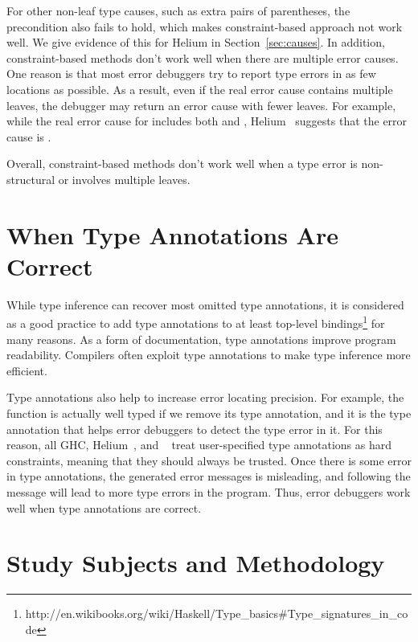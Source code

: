 \documentclass[12pt]{report}	%
\begin{document}
%
For other non-leaf type causes, such as extra pairs
of parentheses, the precondition also fails to hold,
which makes constraint-based approach not work well.
We give evidence of this
for Helium in Section~\ref{sec:causes}.
%
In addition, constraint-based methods don't work well when there are
multiple error causes. One reason is that most
error debuggers try to report type errors in as few locations
as possible. As a result, even if the real error cause contains
multiple leaves, the debugger may return an error cause with
fewer leaves. For example, while the real error cause for
 includes both \prog{(<)} and ,
Helium~\cite{Heeren05:TQT} suggests that the error cause
is .

Overall, constraint-based methods don't work well when a type
error is non-structural or involves multiple leaves.

\section{When Type Annotations Are Correct}
\label{sec:background:annotations}

While type inference can recover most omitted
type annotations, it is considered as a good
practice to add type annotations to at least
top-level bindings\footnote{http://en.wikibooks.org/wiki/Haskell/Type\_basics\#Type\_signatures\_in\_code}
for many reasons. As a form of documentation, type annotations improve
program readability. Compilers often exploit type annotations
to make type inference more efficient.

Type annotations also help to increase error
locating precision. For example,
the function  is
actually well typed if we remove its type annotation,
and it is the type annotation that helps error debuggers to detect
the type error in it. For this reason,
all GHC, Helium~\cite{Heeren03:HLH,Heeren05:TQT},
and \toolMin~\cite{Pavlinovic14:FMT,Pavlinovic15:PST}
treat user-specified type annotations as hard
constraints, meaning that they should always be trusted.
Once there is some error in type annotations, the
generated error messages is misleading, and following the
message will lead to more type errors in the program.
Thus, error debuggers work well when type annotations
are correct.

\section{Study Subjects and Methodology}
\label{sec:subjects}
\end{document}
